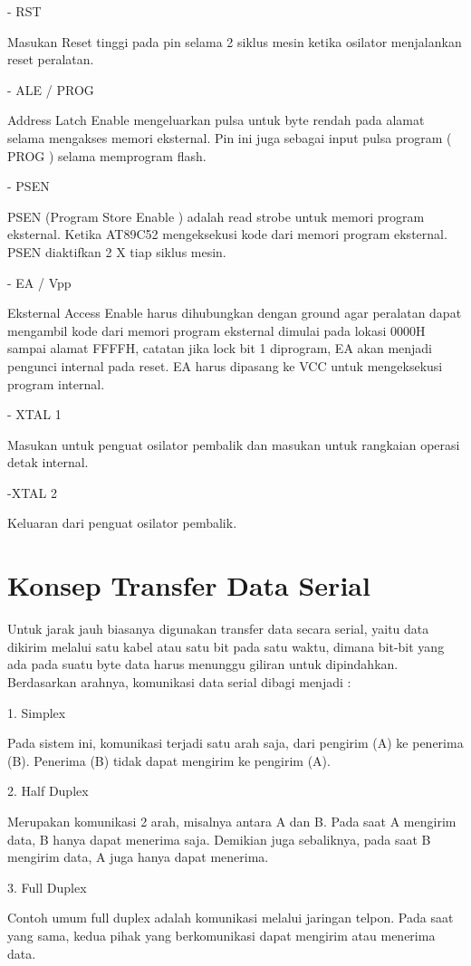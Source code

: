 \documentclass{jtetiproposalskripsi}
\begin{document}
-	RST

Masukan Reset tinggi pada pin selama 2 siklus mesin ketika osilator menjalankan reset peralatan.


-	ALE / PROG

Address Latch Enable mengeluarkan pulsa untuk byte rendah pada alamat selama mengakses memori eksternal. Pin ini juga sebagai input pulsa program ( PROG ) selama memprogram flash.


-	PSEN

PSEN (Program Store Enable ) adalah read strobe untuk memori program eksternal. Ketika AT89C52 mengeksekusi kode dari memori program eksternal. PSEN diaktifkan 2 X tiap siklus mesin.


-	EA / Vpp

Eksternal Access Enable harus dihubungkan dengan ground agar peralatan dapat mengambil kode dari memori program eksternal dimulai pada lokasi 0000H sampai alamat FFFFH, catatan jika lock bit 1 diprogram, EA akan menjadi pengunci internal pada reset. EA harus dipasang ke VCC untuk mengeksekusi program internal.


-	XTAL 1

Masukan untuk penguat osilator pembalik dan masukan untuk rangkaian operasi detak internal.


-XTAL 2

Keluaran dari penguat osilator pembalik.

\section{Konsep Transfer Data Serial }

Untuk jarak jauh biasanya digunakan transfer data secara serial, yaitu data dikirim melalui satu kabel atau satu bit pada satu waktu, dimana bit-bit yang ada pada suatu byte data harus menunggu giliran untuk dipindahkan. Berdasarkan arahnya, komunikasi data serial dibagi menjadi :

1.	Simplex

Pada sistem ini, komunikasi terjadi satu arah saja, dari pengirim (A) ke penerima (B). Penerima (B) tidak dapat mengirim ke pengirim (A).

2.	Half Duplex

Merupakan komunikasi 2 arah, misalnya antara A dan B. Pada saat A mengirim data, B hanya dapat menerima saja. Demikian juga sebaliknya, pada saat B mengirim data, A juga hanya dapat menerima. 

3.	Full Duplex

Contoh umum full duplex adalah komunikasi melalui jaringan telpon. Pada saat yang sama, kedua pihak yang berkomunikasi dapat mengirim atau menerima data.
\end{document}
